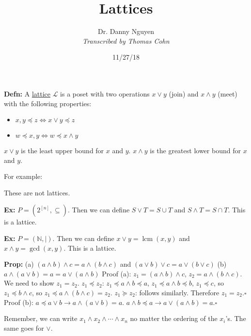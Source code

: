 \documentclass[10pt,letterpaper]{article}
\author{Dr. Danny Nguyen\\ \small\textit{Transcribed by Thomas Cohn}}
\title{Lattices}
\date{11/27/18} %
\newcommand{\n}{\hfill\break}
\newcommand{\defn}[1]{\par\noindent\settowidth{\hangindent}{\textbf{Defn: }}\textbf{Defn: }#1\n}
\newcommand{\prop}[1]{\par\noindent\settowidth{\hangindent}{\textbf{Prop: }}\textbf{Prop: }#1\n}
\newcommand{\ex}[1]{\par\noindent\settowidth{\hangindent}{\textbf{Ex: }}\textbf{Ex: }#1\n}
\newcommand{\proven}{\;$\square$\n}
\newcommand{\naturals}{\mathbb{N}}
\newcommand{\N}{\naturals}
\DeclareMathOperator{\lcm}{lcm}
\begin{document}
\maketitle
\setlength\RaggedRightParindent{\parindent}
\RaggedRight

\defn{A \underline{lattice} $\mathcal{L}$ is a poset with two operations $x\vee{}y$ (join) and $x\wedge{}y$ (meet) with the following properties:
\begin{itemize}
	\item $x,y\preceq{}z\Leftrightarrow{}x\vee{}y\preceq{}z$
	\item $w\preceq{}x,y\Leftrightarrow{}w\preceq{}x\wedge{}y$
\end{itemize}\n
$x\vee{}y$ is the least upper bound for $x$ and $y$.\n
$x\wedge{}y$ is the greatest lower bound for $x$ and $y$.}

\par\noindent For example:


\par\noindent These are not lattices.\n

\ex{$P=(2^{[n]},\subseteq)$. Then we can define $S\vee{}T=S\cup{}T$ and $S\wedge{}T=S\cap{}T$. This is a lattice.}

\ex{$P=(\N,\mid)$. Then we can define $x\vee{}y=\lcm(x,y)$ and $x\wedge{}y=\gcd(x,y)$. This is a lattice.}

\prop{(a) $(a\wedge{}b)\wedge{}c=a\wedge{}(b\wedge{}c)$ and $(a\vee{}b)\vee{}c=a\vee{}(b\vee{}c)$\n
(b) $a\wedge{}(a\vee{}b)=a=a\vee{}(a\wedge{}b)$\n
Proof (a): $z_{1}=(a\wedge{}b)\wedge{}c$, $z_{2}=a\wedge{}(b\wedge{}c)$. We need to show $z_{1}=z_{2}$.\n
$z_{1}\preceq{}z_{2}$: $z_{1}\preceq{}a\wedge{}b\preceq{}a$, $z_{1}\preceq{}a\wedge{}b\preceq{}b$, $z_{1}\preceq{}c$, so $z_{1}\preceq{}b\wedge{}c$, so $z_{1}\preceq{}a\wedge(b\wedge{}c)=z_{2}$.\n
$z_{1}\succeq{}z_{2}$: follows similarly.\n
Therefore $z_{1}=z_{2}$.\proven
Proof (b): $a\preceq{}a\vee{}b\to{}a\wedge(a\vee{}b)=a$. $a\wedge{}b\preceq{}a\to{}a\vee(a\wedge{}b)=a$.\proven}

\par\noindent Remember, we can write $x_{1}\wedge{}x_{2}\wedge\cdots\wedge{}x_{n}$ no matter the ordering of the $x_{i}$'s. The same goes for $\vee$.\n
\end{document}

